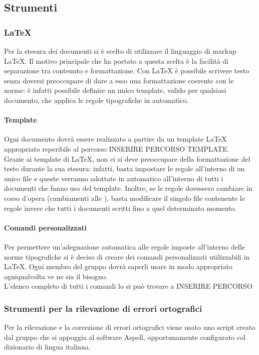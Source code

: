 	\subsection{Strumenti}
		\subsubsection{\LaTeX{}}
			Per la stesura dei documenti si è scelto di utilizzare il linguaggio di markup \LaTeX{}.  Il motivo principale che ha portato a questa scelta è la facilità di separazione tra contenuto e formattazione. Con \LaTeX{} è possibile scrivere testo senza doversi preoccupare di dare a esso una formattazione coerente con le norme: è infatti possibile definire un unico template, valido per qualsiasi documento, che applica le regole tipografiche in automatico.
			\paragraph{Template}
				Ogni documento dovrà essere realizzato a partire da un template \LaTeX{} appropriato reperibile al percorso INSERIRE PERCORSO TEMPLATE.\\
				Grazie ai template di \LaTeX{}, non ci si deve preoccupare della formattazione del testo durante la sua stesura: infatti, basta impostare le regole all’interno di un unico file e queste verranno adottate in automatico all’interno di tutti i documenti che fanno uso del template. Inoltre, se le regole dovessero cambiare in corso d’opera (cambiamenti alle ), basta modificare il singolo file contenente le regole invece che tutti i documenti scritti fino a quel determinato momento.
			\paragraph{Comandi personalizzati}
				Per permettere un’adeguazione automatica alle regole imposte all’interno delle norme tipografiche si è deciso di creare dei comandi personalizzati utilizzabili in \LaTeX{}. Ogni membro del gruppo dovrà saperli usare in modo appropriato ogniqualvolta ve ne sia il bisogno.\\
				L’elenco completo di tutti i comandi lo si può trovare a  INSERIRE PERCORSO
		\subsubsection{Strumenti per la rilevazione di errori ortografici}
			Per la rilevazione e la correzione di errori ortografici viene usato uno script creato dal gruppo \groupname{} che si appoggia al software Aspell, opportunamente configurato col dizionario di lingua italiana.
